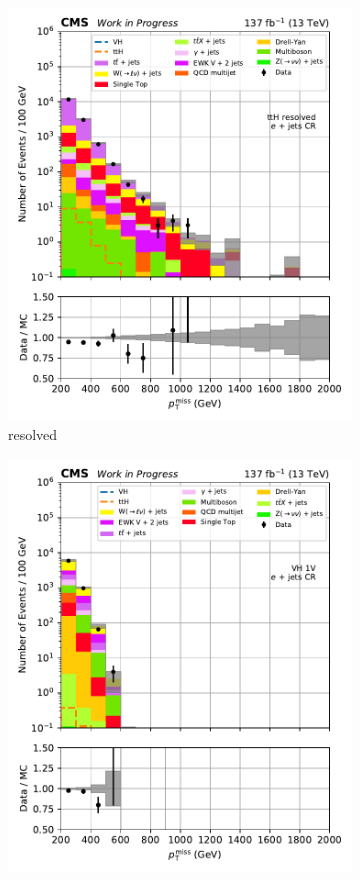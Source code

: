 \begin{figure}[htbp]
\begin{subfigure}[b]{0.24\textwidth}
        \includegraphics[width=\textwidth]{figures/region_plots/full_Run2/region_3/ttH_resolved.pdf}
        \caption{\ttH resolved}
    \end{subfigure}
    \hfill
    \begin{subfigure}[b]{0.24\textwidth}
        \includegraphics[width=\textwidth]{figures/region_plots/full_Run2/region_3/VH_1V.pdf}

\end{subfigure}
\end{figure}
